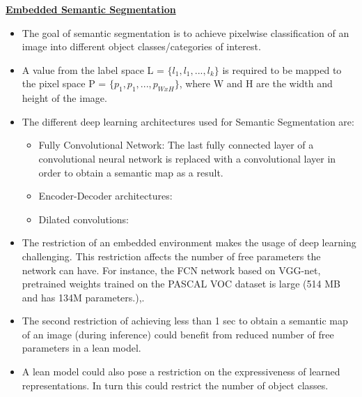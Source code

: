 \documentclass[14pt]{extarticle}
\begin{document}
\begin{center}
\begin{Large}

\underline{\textbf{Embedded Semantic Segmentation}}

\end{Large}
\end{center}

\begin{itemize}

\item The goal of semantic segmentation is to achieve pixelwise classification of an image into different object classes/categories of interest. 

\item A value from the label space L = $\{ l_1, l_1, ..., l_k \}$ is required to be mapped to the pixel space P = $\{ p_1, p_1, ..., p_{WxH} \}$, where W and H are the width and height of the image.

\item The different deep learning architectures used for Semantic Segmentation are:
\begin{itemize}

\item Fully Convolutional Network: The last fully connected layer of a convolutional neural network is replaced with a convolutional layer in order to obtain a semantic map as a result.

\item Encoder-Decoder architectures:

\item Dilated convolutions:

\end{itemize}

\item The restriction of an embedded environment makes the usage of deep learning challenging. This restriction affects the number of free parameters the network can have. For instance, the FCN network based on VGG-net, pretrained weights trained on the PASCAL VOC dataset is large (514 MB and has 134M parameters.)\cite{1},\cite{2}.

\item The second restriction of achieving less than 1 sec to obtain a semantic map of an image (during inference) could benefit from reduced number of free parameters in a lean model.

\item A lean model could also pose a restriction on the expressiveness of learned representations. In turn this could restrict the number of object classes.


\end{itemize}
\end{document}
